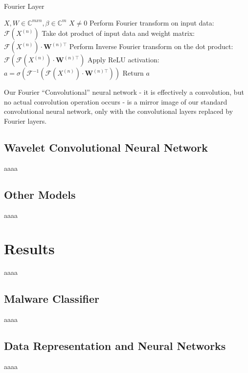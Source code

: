 \documentclass[10pt]{article}
\begin{document}
\begin{algorithm}
\caption{Fourier Layer}
\label{Fourier layer}
\begin{algorithmic}[1]
\REQUIRE $X, W \in \mathbb{C}^{mxn}, \beta \in \mathbb{C}^m$
\ENSURE $X \neq 0$
\STATE Perform Fourier transform on input data: $\mathcal{F}(X^{(n)})$
\STATE Take dot product of input data and weight matrix: $\mathcal{F}(X^{(n)})\cdot \mathbf{W}^{(n)\top}$
\STATE Perform Inverse Fourier transform on the dot product: $\mathcal{F}(\mathcal{F}(X^{(n)})\cdot \mathbf{W}^{(n)\top})$
\STATE Apply ReLU activation: $a = \sigma(\mathcal{F}^{-1}(\mathcal{F}(X^{(n)})\cdot \mathbf{W}^{(n)\top}))$
\STATE Return $a$
\end{algorithmic}
\end{algorithm}

Our Fourier ``Convolutional'' neural network - it is effectively a convolution, but no actual convolution operation occurs - is a mirror image of our standard convolutional neural network, only with the convolutional layers replaced by Fourier layers. 

\subsection{Wavelet Convolutional Neural Network} \label{wavelet cnn}
aaaa

\subsection{Other Models} \label{other models}
aaaa

\section{Results}
aaaa

\subsection{Malware Classifier} \label{malware classifier}
aaaa

\subsection{Data Representation and Neural Networks} \label{data representation}
aaaa
\end{document}
